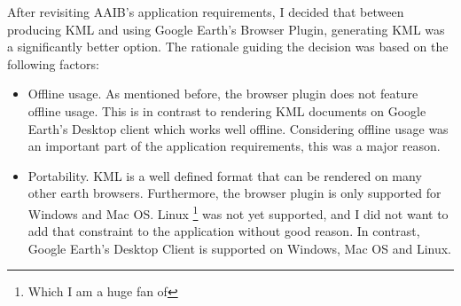 After revisiting AAIB's application requirements, I decided that between producing KML and using Google Earth's Browser Plugin, generating KML was a significantly better option. The rationale guiding the decision was based on the following factors:

\begin{itemize}
\item Offline usage. As mentioned before, the browser plugin does not feature offline usage. This is in contrast to rendering KML documents on Google Earth's Desktop client which works well offline. Considering offline usage was an important part of the application requirements, this was a major reason.
\item Portability. KML is a well defined format that can be rendered on many other earth browsers\citep{ogs:kml}. Furthermore, the browser plugin is only supported for Windows and Mac OS\citep{google:browser-plugin}. Linux \footnote{Which I am a huge fan of} was not yet supported, and I did not want to add that constraint to the application without good reason. In contrast, Google Earth's Desktop Client is supported on Windows, Mac OS and Linux.
\end{itemize}
